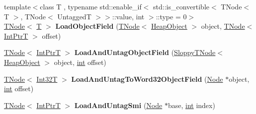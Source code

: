 \begin{DoxyCompactItemize}
\item 
\mbox{\label{classv8_1_1internal_1_1CodeStubAssembler_a02513a0b163623cb35c8d42f29cee1d7}} 
{\footnotesize template$<$class T , typename std\+::enable\+\_\+if$<$ std\+::is\+\_\+convertible$<$ T\+Node$<$ T $>$, T\+Node$<$ Untagged\+T $>$$>$\+::value, int $>$\+::type  = 0$>$ }\\\mbox{\hyperlink{classv8_1_1internal_1_1compiler_1_1TNode}{T\+Node}}$<$ \mbox{\hyperlink{classv8_1_1internal_1_1torque_1_1T}{T}} $>$ {\bfseries Load\+Object\+Field} (\mbox{\hyperlink{classv8_1_1internal_1_1compiler_1_1TNode}{T\+Node}}$<$ \mbox{\hyperlink{classv8_1_1internal_1_1HeapObject}{Heap\+Object}} $>$ object, \mbox{\hyperlink{classv8_1_1internal_1_1compiler_1_1TNode}{T\+Node}}$<$ \mbox{\hyperlink{structv8_1_1internal_1_1IntPtrT}{Int\+PtrT}} $>$ offset)
\item 
\mbox{\label{classv8_1_1internal_1_1CodeStubAssembler_ab3d3219196e49a303162ac352defcc45}} 
\mbox{\hyperlink{classv8_1_1internal_1_1compiler_1_1TNode}{T\+Node}}$<$ \mbox{\hyperlink{structv8_1_1internal_1_1IntPtrT}{Int\+PtrT}} $>$ {\bfseries Load\+And\+Untag\+Object\+Field} (\mbox{\hyperlink{classv8_1_1internal_1_1compiler_1_1SloppyTNode}{Sloppy\+T\+Node}}$<$ \mbox{\hyperlink{classv8_1_1internal_1_1HeapObject}{Heap\+Object}} $>$ object, \mbox{\hyperlink{classint}{int}} offset)
\item 
\mbox{\label{classv8_1_1internal_1_1CodeStubAssembler_abb0831fd37e6f513ba1d603d29fbffce}} 
\mbox{\hyperlink{classv8_1_1internal_1_1compiler_1_1TNode}{T\+Node}}$<$ \mbox{\hyperlink{structv8_1_1internal_1_1Int32T}{Int32T}} $>$ {\bfseries Load\+And\+Untag\+To\+Word32\+Object\+Field} (\mbox{\hyperlink{classv8_1_1internal_1_1compiler_1_1Node}{Node}} $\ast$object, \mbox{\hyperlink{classint}{int}} offset)
\item 
\mbox{\label{classv8_1_1internal_1_1CodeStubAssembler_a3c6f2950985692ad76873596d54fb4de}} 
\mbox{\hyperlink{classv8_1_1internal_1_1compiler_1_1TNode}{T\+Node}}$<$ \mbox{\hyperlink{structv8_1_1internal_1_1IntPtrT}{Int\+PtrT}} $>$ {\bfseries Load\+And\+Untag\+Smi} (\mbox{\hyperlink{classv8_1_1internal_1_1compiler_1_1Node}{Node}} $\ast$base, \mbox{\hyperlink{classint}{int}} index)
\item 

\end{DoxyCompactItemize}
